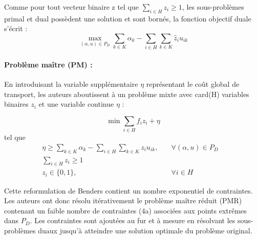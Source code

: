 Comme pour tout vecteur binaire z tel que $\sum_{i \in H} z_i \ge 1$, les sous-problèmes primal et dual possèdent une solution et sont bornés, la fonction objectif duale s'écrit :
\[ \max_{(\alpha,u) \in P_D} \sum_{k \in K}\alpha_k - \sum_{i \in H}\sum_{k \in K} \hat{z}_iu_{ik}\]




\paragraph{Problème maître (PM) :} En introduisant la variable supplémentaire $\eta$ représentant le coût global de transport, les auteurs aboutissent à un problème mixte
avec card(H) variables binaires $z_i$ et une variable continue $\eta$ :  


\[ \min \sum_{i \in H} f_iz_i + \eta\]
tel que
\begin{subequations}
    \begin{align}
       \eta \ge \sum_{k \in K}\alpha_k - \sum_{i \in H}\sum_{k \in K} z_iu_{ik}, \quad &\forall{(\alpha,u) \in P_D}&\\
       \sum_{i \in H} z_i \ge 1 \quad &&\\
        z_i \in \{0,1\}, \quad & \forall{i \in H}&
    \end{align}
\end{subequations}
	

Cette reformulation de Benders contient un nombre exponentiel de contraintes. Les auteurs ont donc résolu itérativement le problème maître réduit (PMR) contenant un faible nombre de contraintes (4a) associées aux points extrêmes dans $P_D$. Les contraintes sont ajoutées
au fur et à mesure en résolvant les sous-problèmes duaux jusqu'à atteindre une solution optimale du problème original.

